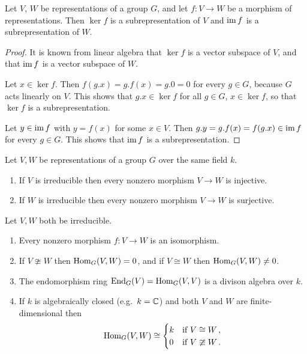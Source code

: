 \begin{lemma}\label{lemma: ker and im subrepresentations}
  Let $V$, $W$ be representations of a group $G$, and let $f \colon V \to W$ be a morphism of representations.
  Then $\ker f$ is a subrepresentation of $V$ and $\operatorname{im} f$ is a subrepresentation of $W$.
\end{lemma}
\begin{proof}
  It is known from linear algebra that $\ker f$ is a vector subspace of $V$, and that $\operatorname{im} f$ is a vector subspace of $W$.
  
  Let $x \in \ker f$.
  Then $f(g.x) = g.f(x) = g.0 = 0$ for every $g \in G$, because $G$ acts linearly on $V$.
  This shows that $g.x \in \ker f$ for all $g \in G$, $x \in \ker f$, so that $\ker f$ is a subrepresentation.
  
  Let $y \in \operatorname{im} f$ with $y = f(x)$ for some $x \in V$.
  Then $g.y = g.f(x) = f(g.x) \in \operatorname{im} f$ for every $g \in G$.
  This shows that $\operatorname{im} f$ is a subrepresentation.
\end{proof}


\begin{proposition}
  \label{proposition: Schurs lemma representations}
  Let $V, W$ be representations of a group $G$ over the same field $k$.
  \begin{enumerate}
    \item
      \label{enumerate: nonzero injective irreducible}
      If $V$ is irreducible then every nonzero morphism $V \to W$ is injective.
    \item
      \label{enumerate: nonzero surjective irreducible}
      If $W$ is irreducible then every nonzero morphism $V \to W$ is surjective.
  \end{enumerate}
  Let $V, W$ both be irreducible.
  \begin{enumerate}[resume]
    \item
      \label{enumerate: nonzero morphism is already an iso}
      Every nonzero morphism $f \colon V \to W$ is an isomorphism.
    \item
      If $V \ncong W$ then $\operatorname{Hom}_G(V,W) = 0$, and if $V \cong W$ then $\operatorname{Hom}_G(V,W) \neq 0$.
    \item
      The endomorphism ring $\operatorname{End}_G(V) = \operatorname{Hom}_G(V,V)$ is a divison algebra over $k$.
    \item
      \label{enumerate: morphism space is one-dimensional}
      If $k$ is algebraically closed (e.g.\ $k = \mathbb{C}$) and both $V$ and $W$ are finite-dimensional then
      \[
              \operatorname{Hom}_G(V,W)
        \cong \begin{cases}
                k & \text{if $V \cong W$}   \,, \\
                0 & \text{if $V \ncong W$}  \,.
              \end{cases}
      \]
  \end{enumerate}
\end{proposition}


